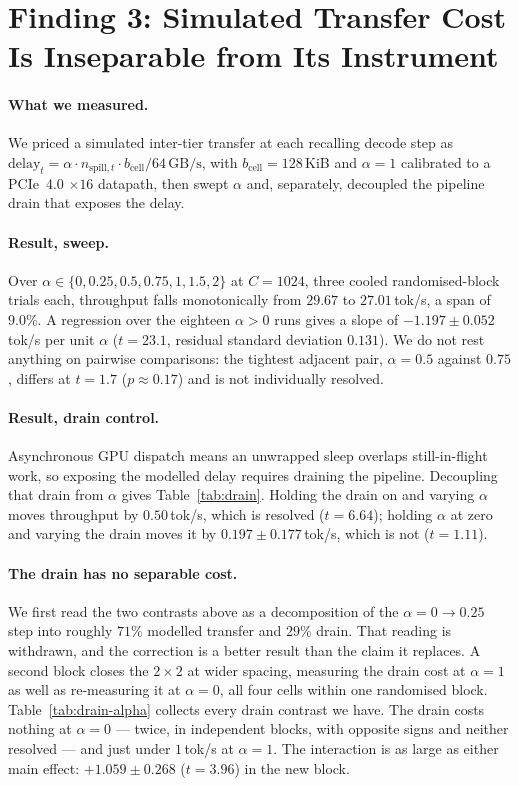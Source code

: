 \documentclass[manuscript,anonymous,review]{acmart}
\begin{document}
\section{Finding 3: Simulated Transfer Cost Is Inseparable from Its
Instrument}
\label{sec:f3}

\paragraph{What we measured.} We priced a simulated inter-tier transfer
at each recalling decode step as $\text{delay}_t = \alpha \cdot
n_{\text{spill},t} \cdot b_\text{cell} / 64\,\text{GB/s}$, with
$b_\text{cell} = 128$\,KiB and $\alpha = 1$ calibrated to a PCIe~4.0
$\times16$ datapath, then swept $\alpha$ and, separately, decoupled the
pipeline drain that exposes the delay.

\paragraph{Result, sweep.} Over $\alpha \in \{0, 0.25, 0.5, 0.75, 1,
1.5, 2\}$ at $C = 1024$, three cooled randomised-block trials each,
throughput falls monotonically from $29.67$ to $27.01$\,tok/s, a span
of $9.0\%$. A regression over the eighteen $\alpha > 0$ runs gives a
slope of $-1.197 \pm 0.052$\,tok/s per unit $\alpha$ ($t = 23.1$,
residual standard deviation $0.131$). We do not rest anything on
pairwise comparisons: the tightest adjacent pair, $\alpha = 0.5$
against $0.75$, differs at $t = 1.7$ ($p \approx 0.17$) and is not
individually resolved.

\paragraph{Result, drain control.} Asynchronous GPU dispatch means an
unwrapped sleep overlaps still-in-flight work, so exposing the modelled
delay requires draining the pipeline. Decoupling that drain from
$\alpha$ gives Table~\ref{tab:drain}. Holding the drain on and varying
$\alpha$ moves throughput by $0.50$\,tok/s, which is resolved
($t = 6.64$); holding $\alpha$ at zero and varying the drain moves it
by $0.197 \pm 0.177$\,tok/s, which is not ($t = 1.11$).

\paragraph{The drain has no separable cost.} We first read the two
contrasts above as a decomposition of the $\alpha = 0 \rightarrow 0.25$
step into roughly $71\%$ modelled transfer and $29\%$ drain. That
reading is withdrawn, and the correction is a better result than the
claim it replaces. A second block closes the $2 \times 2$ at wider
spacing, measuring the drain cost at $\alpha = 1$ as well as
re-measuring it at $\alpha = 0$, all four cells within one randomised
block. Table~\ref{tab:drain-alpha} collects every drain contrast we
have. The drain costs nothing at $\alpha = 0$ --- twice, in independent
blocks, with opposite signs and neither resolved --- and just under
$1$\,tok/s at $\alpha = 1$. The interaction is as large as either main
effect: $+1.059 \pm 0.268$ ($t = 3.96$) in the new block.
\end{document}
